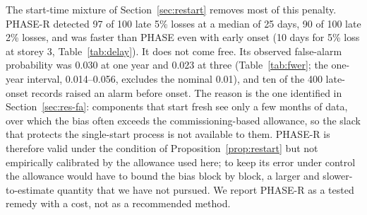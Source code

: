 \documentclass[12pt,a4paper]{article}
\newenvironment{revblock}{}{}
\newenvironment{revblock}{\begingroup\color{revcol}}{\endgroup}
\begin{document}
\begin{revblock}
The start-time mixture of Section~\ref{sec:restart} removes most of this penalty. PHASE-R detected 97 of 100 late 5\% losses at a median of 25 days, 90 of 100 late 2\% losses, and was faster than PHASE even with early onset (10 days for 5\% loss at storey 3, Table~\ref{tab:delay}). It does not come free. Its observed false-alarm probability was 0.030 at one year and 0.023 at three (Table~\ref{tab:fwer}; the one-year interval, 0.014--0.056, excludes the nominal 0.01), and ten of the 400 late-onset records raised an alarm before onset. The reason is the one identified in Section~\ref{sec:res-fa}: components that start fresh see only a few months of data, over which the bias often exceeds the commissioning-based allowance, so the slack that protects the single-start process is not available to them. PHASE-R is therefore valid under the condition of Proposition~\ref{prop:restart} but not empirically calibrated by the allowance used here; to keep its error under control the allowance would have to bound the bias block by block, a larger and slower-to-estimate quantity that we have not pursued. We report PHASE-R as a tested remedy with a cost, not as a recommended method.
\end{revblock}
\end{document}
